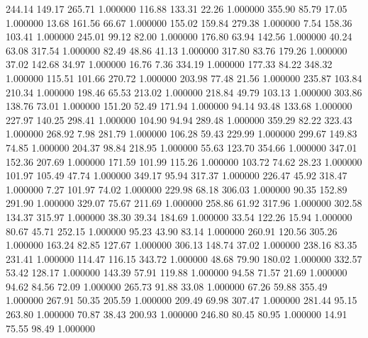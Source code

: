     244.14    149.17    265.71  1.000000
    116.88    133.31     22.26  1.000000
    355.90     85.79     17.05  1.000000
     13.68    161.56     66.67  1.000000
    155.02    159.84    279.38  1.000000
      7.54    158.36    103.41  1.000000
    245.01     99.12     82.00  1.000000
    176.80     63.94    142.56  1.000000
     40.24     63.08    317.54  1.000000
     82.49     48.86     41.13  1.000000
    317.80     83.76    179.26  1.000000
     37.02    142.68     34.97  1.000000
     16.76      7.36    334.19  1.000000
    177.33     84.22    348.32  1.000000
    115.51    101.66    270.72  1.000000
    203.98     77.48     21.56  1.000000
    235.87    103.84    210.34  1.000000
    198.46     65.53    213.02  1.000000
    218.84     49.79    103.13  1.000000
    303.86    138.76     73.01  1.000000
    151.20     52.49    171.94  1.000000
     94.14     93.48    133.68  1.000000
    227.97    140.25    298.41  1.000000
    104.90     94.94    289.48  1.000000
    359.29     82.22    323.43  1.000000
    268.92      7.98    281.79  1.000000
    106.28     59.43    229.99  1.000000
    299.67    149.83     74.85  1.000000
    204.37     98.84    218.95  1.000000
     55.63    123.70    354.66  1.000000
    347.01    152.36    207.69  1.000000
    171.59    101.99    115.26  1.000000
    103.72     74.62     28.23  1.000000
    101.97    105.49     47.74  1.000000
    349.17     95.94    317.37  1.000000
    226.47     45.92    318.47  1.000000
      7.27    101.97     74.02  1.000000
    229.98     68.18    306.03  1.000000
     90.35    152.89    291.90  1.000000
    329.07     75.67    211.69  1.000000
    258.86     61.92    317.96  1.000000
    302.58    134.37    315.97  1.000000
     38.30     39.34    184.69  1.000000
     33.54    122.26     15.94  1.000000
     80.67     45.71    252.15  1.000000
     95.23     43.90     83.14  1.000000
    260.91    120.56    305.26  1.000000
    163.24     82.85    127.67  1.000000
    306.13    148.74     37.02  1.000000
    238.16     83.35    231.41  1.000000
    114.47    116.15    343.72  1.000000
     48.68     79.90    180.02  1.000000
    332.57     53.42    128.17  1.000000
    143.39     57.91    119.88  1.000000
     94.58     71.57     21.69  1.000000
     94.62     84.56     72.09  1.000000
    265.73     91.88     33.08  1.000000
     67.26     59.88    355.49  1.000000
    267.91     50.35    205.59  1.000000
    209.49     69.98    307.47  1.000000
    281.44     95.15    263.80  1.000000
     70.87     38.43    200.93  1.000000
    246.80     80.45     80.95  1.000000
     14.91     75.55     98.49  1.000000
